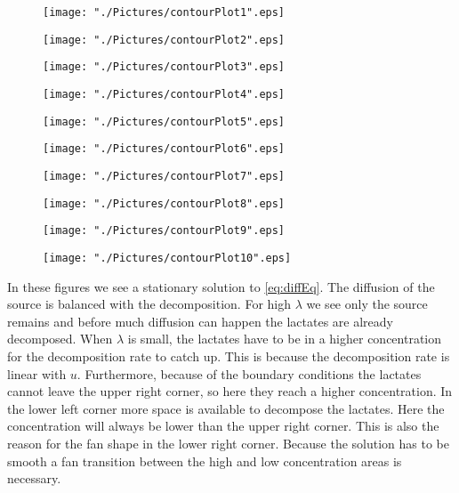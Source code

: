 \documentclass[10pt,a4paper]{article}
\begin{document}
\begin{figure}[H]
	\centering
	\texttt{[image: "./Pictures/contourPlot1".eps]}
\end{figure}
\begin{figure}[H]
	\centering
	\texttt{[image: "./Pictures/contourPlot2".eps]}
\end{figure}
\begin{figure}[H]
	\centering
	\texttt{[image: "./Pictures/contourPlot3".eps]}
\end{figure}
\begin{figure}[H]
	\centering
	\texttt{[image: "./Pictures/contourPlot4".eps]}
\end{figure}
\begin{figure}[H]
	\centering
	\texttt{[image: "./Pictures/contourPlot5".eps]}
\end{figure}
\begin{figure}[H]
	\centering
	\texttt{[image: "./Pictures/contourPlot6".eps]}
\end{figure}
\begin{figure}[H]
	\centering
	\texttt{[image: "./Pictures/contourPlot7".eps]}
\end{figure}
\begin{figure}[H]
	\centering
	\texttt{[image: "./Pictures/contourPlot8".eps]}
\end{figure}
\begin{figure}[H]
	\centering
	\texttt{[image: "./Pictures/contourPlot9".eps]}
\end{figure}
\begin{figure}[H]
	\centering
	\texttt{[image: "./Pictures/contourPlot10".eps]}
\end{figure}

In these figures we see a stationary solution to \cref{eq:diffEq}. 
The diffusion of the source is balanced with the decomposition. 
For high $\lambda$ we see only the source remains and before much diffusion can happen the lactates are already decomposed. 
When $\lambda$ is small, the lactates have to be in a higher concentration for the decomposition rate to catch up. 
This is because the decomposition rate is linear with $u$. 
Furthermore, because of the boundary conditions the lactates cannot leave the upper right corner, so here they reach a higher concentration. 
In the lower left corner more space is available to decompose the lactates. 
Here the concentration will always be lower than the upper right corner.
This is also the reason for the fan shape in the lower right corner.
Because the solution has to be smooth a fan transition between the high and low concentration areas is necessary.
\end{document}

